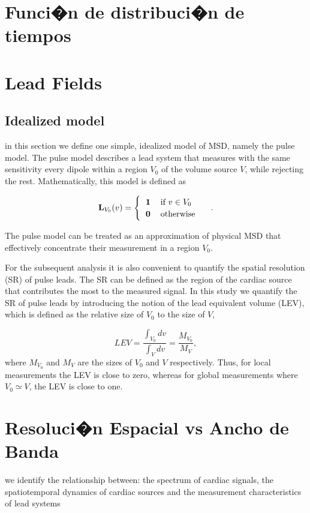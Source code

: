 \section{Funci�n de distribuci�n de tiempos}

\section{Lead Fields}

\subsection{Idealized model}

in this section we define one simple, idealized model of MSD, namely the pulse
model. The pulse model describes a lead system that measures with the same
sensitivity every dipole within a region $V_0$ of the volume source $V$, while
rejecting the rest. Mathematically, this model is defined as

\begin{equation}
\label{def:pulso}
\mathbf{L}_{V_0}(v)= 
\begin{cases}
    \begin{tabular}{ll}
    $\mathbf{1}$ & if $v\in V_0$\\
    $\mathbf{0}$ & otherwise
        \end{tabular}
 \end{cases}.
\end{equation}

The pulse model can be treated as an approximation of physical MSD that
effectively concentrate their measurement in a region $V_0$.

For the subsequent analysis it is also convenient to quantify the spatial
resolution (SR) of pulse leads. The SR can be defined as the region of the
cardiac source that contributes the most to the measured signal. In this study
we quantify the SR of pulse leads by introducing the notion of the lead
equivalent volume (LEV), which is defined as the relative size of $V_{0}$ to
the size of $V$,

\begin{equation}
LEV=\frac{\int_{V_{0}}{dv}}{\int_{V}{dv}}=\frac{M_{V_{0}}}{M_V},\label{eq:SR}
\end{equation}
where $M_{V_{0}}$ and $M_V$ are the sizes of $V_{0}$ and $V$ respectively.
Thus, for local measurements the LEV is close to zero, whereas for global
measurements where $V_0\simeq V$, the LEV is close to one.


\section{Resoluci�n Espacial vs Ancho de Banda}
we identify the relationship between: the spectrum of cardiac signals,
the spatiotemporal dynamics of cardiac sources and the measurement
characteristics of lead systems
 
